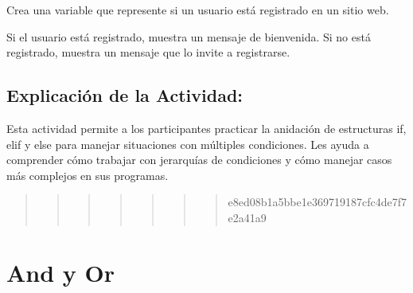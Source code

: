 \documentclass[
  a4paper,
  DIV=11,
  numbers=noendperiod,
  onepage,
  openany]{scrreprt}
\begin{document}
\begin{tcolorbox}[enhanced jigsaw, colbacktitle=quarto-callout-important-color!10!white, toprule=.15mm, leftrule=.75mm, titlerule=0mm, opacityback=0, rightrule=.15mm, opacitybacktitle=0.6, breakable, left=2mm, coltitle=black, title=\textcolor{quarto-callout-important-color}{\faExclamation}\hspace{0.5em}{Actividad Práctica:}, toptitle=1mm, bottomtitle=1mm, arc=.35mm, bottomrule=.15mm, colback=white, colframe=quarto-callout-important-color-frame]

Crea una variable que represente si un usuario está registrado en un
sitio web.

Si el usuario está registrado, muestra un mensaje de bienvenida. Si no
está registrado, muestra un mensaje que lo invite a registrarse.

\end{tcolorbox}

\hypertarget{explicaciuxf3n-de-la-actividad-31}{%
\section{Explicación de la
Actividad:}\label{explicaciuxf3n-de-la-actividad-31}}

Esta actividad permite a los participantes practicar la anidación de
estructuras if, elif y else para manejar situaciones con múltiples
condiciones. Les ayuda a comprender cómo trabajar con jerarquías de
condiciones y cómo manejar casos más complejos en sus programas.

\begin{quote}
\begin{quote}
\begin{quote}
\begin{quote}
\begin{quote}
\begin{quote}
\begin{quote}
e8ed08b1a5bbe1e369719187cfc4de7f7e2a41a9
\end{quote}
\end{quote}
\end{quote}
\end{quote}
\end{quote}
\end{quote}
\end{quote}

\hypertarget{and-y-or}{%
\chapter{And y Or}\label{and-y-or}}
\end{document}
